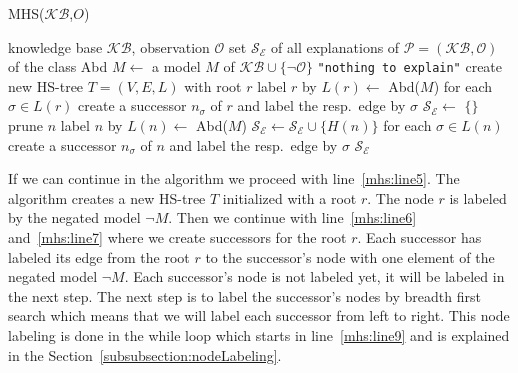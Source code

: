 \documentclass[12pt,a4paper]{article}
\begin{document}
\begin{algorithm}[H] 
	\footnotesize
	\caption{MHS($\mathcal{KB}$,$O$)}
	\label{alg:mhs}
	\begin{algorithmic}[1]
		\Require knowledge base $\mathcal{KB}$, observation $\mathcal{O}$
		\Ensure set $\mathcal{S}_{\mathcal{E}}$ of all explanations of $\mathcal{P}=(\mathcal{KB}, \mathcal{O})$ of the class Abd
		\State $M \gets$ a model $M$ of $\mathcal{KB} \cup \{\neg \mathcal{O}\}$ \label{mhs:line1}
		 \label{mhs:line2}
		\State \Return \texttt{"nothing to explain"} %
		\label{soal:nte}
		\EndIf %
		\State create new HS-tree $T=(V,E,L)$ with root $r$ \label{mhs:line5}
		\State label $r$ by $L(r) \gets$ Abd($M$) \label{mhs:line6}
		\State for each $\sigma\in L(r)$ create a successor $n_\sigma$ of $r$ \label{mhs:line7}
		and label the resp.\ edge by $\sigma$ %
		\State $\mathcal{S}_{\mathcal{E}} \gets$ $\{\}$ %
		  \label{mhs:line9}
		 \label{mhs:line10}
		\State prune $n$
		\State label $n$ by $L(n) \gets$  Abd($M$) 
		\Else %
		\State $\mathcal{S}_\mathcal{E} \gets \mathcal{S}_\mathcal{E} \cup \{H(n)\}$ \label{mhs:line15}
		\EndIf
		\State for each $\sigma\in L(n)$ create a successor $n_\sigma$ of $n$
		and label the resp.\ edge by $\sigma$ %
		\label{soal:modproc:e}
		\EndWhile
		\label{soal:loop:e}
		\label{soal:output}
		\State \Return $\mathcal{S}_\mathcal{E}$ \label{mhs:line19}
	\end{algorithmic}
\end{algorithm}

If we can continue in the algorithm we proceed with line~\ref{mhs:line5}. The algorithm creates a new HS-tree $T$ initialized with a root $r$. The node $r$ is labeled by the negated model $\neg M$. Then we continue with line~\ref{mhs:line6} and~\ref{mhs:line7} where we create successors for the root $r$. Each successor has labeled its edge from the root $r$ to the successor's node with one element of the negated model $\neg M$. Each successor's node is not labeled yet, it will be labeled in the next step. The next step is to label the successor's nodes by breadth first search which means that we will label each successor from left to right. This node labeling is done in the while loop which starts in line~\ref{mhs:line9} and is explained in the Section~\ref{subsubsection:nodeLabeling}.
\end{document}
